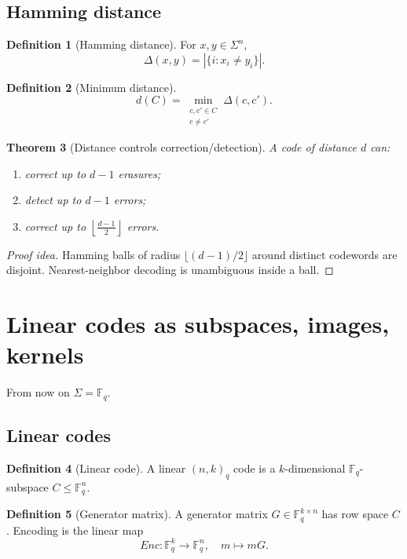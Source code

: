 \documentclass[11pt]{article}
\newtheorem{theorem}{Theorem}[section]
\theoremstyle{definition}
\newtheorem{definition}[theorem]{Definition}
\theoremstyle{remark}
\newcommand{\F}{\mathbb{F}}
\begin{document}
	\subsection{Hamming distance}
	\begin{definition}[Hamming distance]
		For \(x,y\in \Sigma^n\),
		\[
		\Delta(x,y)=|\{i: x_i\neq y_i\}|.
		\]
	\end{definition}
	
	\begin{definition}[Minimum distance]
		\[
		d(C)=\min_{\substack{c,c'\in C\\c\neq c'}}\Delta(c,c').
		\]
	\end{definition}
	
	\begin{theorem}[Distance controls correction/detection]
		A code of distance \(d\) can:
		\begin{enumerate}[label=(\alph*)]
			\item correct up to \(d-1\) erasures;
			\item detect up to \(d-1\) errors;
			\item correct up to \(\left\lfloor \frac{d-1}{2}\right\rfloor\) errors.
		\end{enumerate}
	\end{theorem}
	
	\begin{proof}[Proof idea]
		Hamming balls of radius \(\lfloor(d-1)/2\rfloor\) around distinct codewords are disjoint.
		Nearest-neighbor decoding is unambiguous inside a ball.
	\end{proof}
	
	\section{Linear codes as subspaces, images, kernels}
	From now on \(\Sigma=\F_q\).
	
	\subsection{Linear codes}
	\begin{definition}[Linear code]
		A linear \((n,k)_q\) code is a \(k\)-dimensional \(\F_q\)-subspace \(C\le \F_q^n\).
	\end{definition}
	
	\begin{definition}[Generator matrix]
		A generator matrix \(G\in \F_q^{k\times n}\) has row space \(C\).
		Encoding is the linear map
		\[
		Enc:\F_q^k\to \F_q^n,\quad m\mapsto mG.
		\]
	\end{definition}
	
\end{document}
